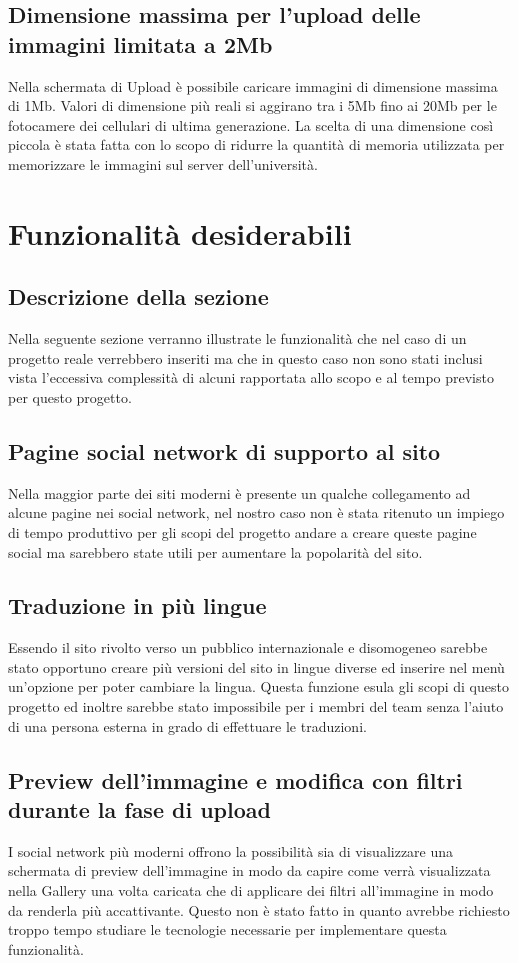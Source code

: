 \documentclass[openany, a4paper, 12pt]{report}
\begin{document}
		\section{Dimensione massima per l'upload delle immagini limitata a 2Mb}
				Nella schermata di Upload è possibile caricare immagini di dimensione massima di 1Mb. Valori di dimensione più reali si aggirano tra i 5Mb fino ai 20Mb per le fotocamere dei cellulari di ultima generazione. La scelta di una dimensione così piccola è stata fatta con lo scopo di ridurre la quantità di memoria utilizzata per memorizzare le immagini sul server dell'università.\\
			
	\chapter{Funzionalit\`{a} desiderabili}
		\section{Descrizione della sezione}
		Nella seguente sezione verranno illustrate le funzionalità che nel caso di un progetto reale verrebbero inseriti ma che in questo caso non sono stati inclusi vista l'eccessiva complessità di alcuni rapportata allo scopo e al tempo previsto per questo progetto.

		\section{Pagine social network di supporto al sito}
		Nella maggior parte dei siti moderni è presente un qualche collegamento ad alcune pagine nei social network, nel nostro caso non è stata ritenuto un impiego di tempo produttivo per gli scopi del progetto andare a creare queste pagine social ma sarebbero state utili per aumentare la popolarità del sito.

		\section{Traduzione in più lingue}
		Essendo il sito rivolto verso un pubblico internazionale e disomogeneo sarebbe stato opportuno creare più versioni del sito in lingue diverse ed inserire nel menù un'opzione per poter cambiare la lingua. Questa funzione esula gli scopi di questo progetto ed inoltre sarebbe stato impossibile per i membri del team senza l'aiuto di una persona esterna in grado di effettuare le traduzioni.
		
		\section{Preview dell'immagine e modifica con filtri durante la fase di upload}
		I social network più moderni offrono la possibilità sia di visualizzare una schermata di preview dell'immagine in modo da capire come verrà visualizzata nella Gallery una volta caricata che di applicare dei filtri all'immagine in modo da renderla più accattivante. Questo non è stato fatto in quanto avrebbe richiesto troppo tempo studiare le tecnologie necessarie per implementare questa funzionalità.
\end{document}
